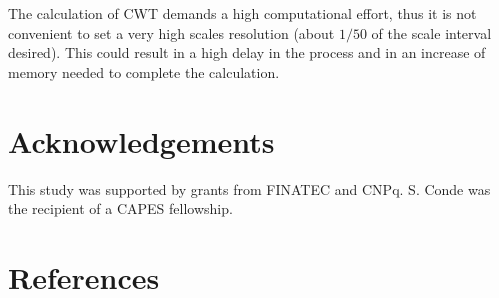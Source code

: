 \documentclass[12pt, a4paper]{article}
\begin{document}
The calculation of CWT demands a high computational effort, thus it is not convenient to set a very high scales resolution (about $1/50$ of the scale interval desired). This could result in a high delay in the process and in an increase of memory needed to complete the calculation. 

\section{Acknowledgements}

This study was supported by grants from FINATEC and CNPq. S. Conde was the recipient of a CAPES fellowship. 

\section{References}
\end{document}
